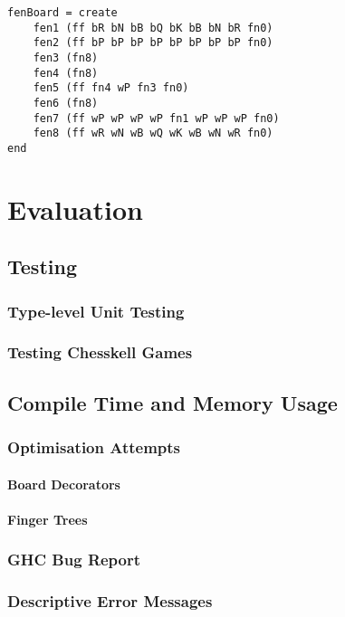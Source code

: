 \documentclass[12pt, a4paper, bibliography=totocnumbered]{scrreprt}
\begin{document}
\begin{lstlisting}
fenBoard = create
    fen1 (ff bR bN bB bQ bK bB bN bR fn0)
    fen2 (ff bP bP bP bP bP bP bP bP fn0)
    fen3 (fn8)
    fen4 (fn8)
    fen5 (ff fn4 wP fn3 fn0)
    fen6 (fn8)
    fen7 (ff wP wP wP wP fn1 wP wP wP fn0)
    fen8 (ff wR wN wB wQ wK wB wN wR fn0)
end
\end{lstlisting}


\chapter{Evaluation}

\section{Testing}

\subsection{Type-level Unit Testing}

\subsection{Testing Chesskell Games}

\section{Compile Time and Memory Usage}

\subsection{Optimisation Attempts}

\subsubsection{Board Decorators}

\subsubsection{Finger Trees}

\subsection{GHC Bug Report}

\subsection{Descriptive Error Messages}
\end{document}
